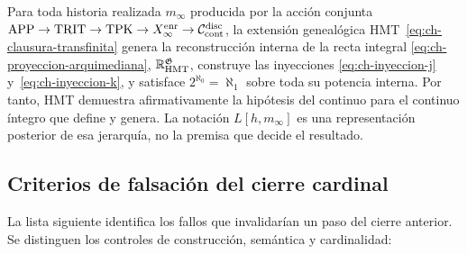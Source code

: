 \begin{theorem}
\label{thm:decision-continuo-hmt}
Para toda historia realizada
\(m_\infty\) producida por la acción conjunta
\(\mathrm{APP}\to\mathrm{TRIT}\to\mathrm{TPK}\to
X_\infty^{\rm enr}\to\mathcal C_{\rm cont}^{\rm disc}\), la extensión
genealógica HMT~\eqref{eq:ch-clausura-transfinita} genera la reconstrucción interna de la recta integral
\eqref{eq:ch-proyeccion-arquimediana}, \(\mathbb R_{\rm HMT}^{\mathfrak G}\), construye las inyecciones
\eqref{eq:ch-inyeccion-j} y~\eqref{eq:ch-inyeccion-k}, y satisface
\(2^{\aleph_0}=\aleph_1\) sobre toda su potencia interna. Por tanto, HMT
demuestra afirmativamente la hipótesis del continuo para el continuo
íntegro que define y genera. La notación \(L[h,m_\infty]\) es una
representación posterior de esa jerarquía, no la premisa que decide el
resultado.
\end{theorem}


\subsection{Criterios de falsación del cierre cardinal}

La lista siguiente identifica los fallos que invalidarían un paso del cierre
anterior. Se distinguen los controles de construcción, semántica y
cardinalidad:

